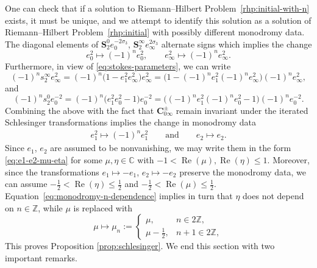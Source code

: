 \documentclass[11pt]{article}
\numberwithin{equation}{section}
\numberwithin{equation}{section}
\newcommand{\C}{{\mathbb{C}}}
\newcommand{\Z}{{\mathbb{Z}}}
\newcommand{\re}{\operatorname{Re}}
\begin{document}
One can check that if a solution to Riemann--Hilbert Problem~\ref{rhp:initial-with-n} exists, it must be unique, and we attempt to identify this solution as a solution of Riemann--Hilbert Problem~\ref{rhp:initial} with possibly different monodromy data. The diagonal elements of $\mathbf{S}_2^0 e_0^{-2\sigma_3}$, $\mathbf{S}_2^\infty e_\infty^{2\sigma_3}$ alternate signs which implies the change
\[
e_0^2 \mapsto (-1)^n e_0^2, \qquad e_\infty^2 \mapsto (-1)^n e_\infty^2.
\]
Furthermore, in view of \eqref{eq:stokes-parameters}, we can write
\[
(-1)^n s_2^\infty e_\infty^2 = (-1)^n\big(1 - e_1^2 e_\infty^2\big) e_\infty^2 = \big(1 - (-1)^ne_1^2(-1)^ne_\infty^2\big)(-1)^ne_\infty^2,
\]
and
\[
(-1)^n s_2^0 e_0^{-2} = (-1)^n\big(e_1^2 e_0^2 - 1\big) e_0^{-2} = \big((-1)^ne_1^2(-1)^ne_0^2 -1\big)(-1)^ne_0^{-2}.
\]
Combining the above with the fact that $\mathbf{C}_{0 \infty}^\pm$ remain invariant under the iterated Schlesinger transformations implies the change in monodromy data
\begin{gather} \label{eq:monodromy-n-dependence}
e_1^2 \mapsto (-1)^ne_1^2 \qquad \text{and} \qquad e_2 \mapsto e_2.
\end{gather}
Since $e_1$, $e_2$ are assumed to be nonvanishing, we may write them in the form \eqref{eq:e1-e2-mu-eta}
for some ${\mu, \eta \in \C}$ with $-1 < \re(\mu), \re(\eta) \leq 1$. Moreover, since the transformations $e_1\mapsto-e_1$, ${e_2\mapsto -e_2}$ preserve the monodromy data, we can assume $-\frac{1}{2}<\re(\eta)\le\frac{1}{2}$ and $-\frac{1}{2}<\re(\mu) \leq \frac{1}{2}$. Equation~\eqref{eq:monodromy-n-dependence} implies in turn that $\eta$ does not depend on $n \in \Z$, while $\mu$ is replaced with
\begin{equation}
\label{eq:mu-n}
\mu \mapsto \mu_n := \begin{cases} \mu, & n \in 2\Z, \\ \mu-\frac{1}{2}, & n +1 \in 2\Z, \end{cases}
\end{equation}
This proves Proposition \ref{prop:schlesinger}. We end this section with two important remarks.
\end{document}
